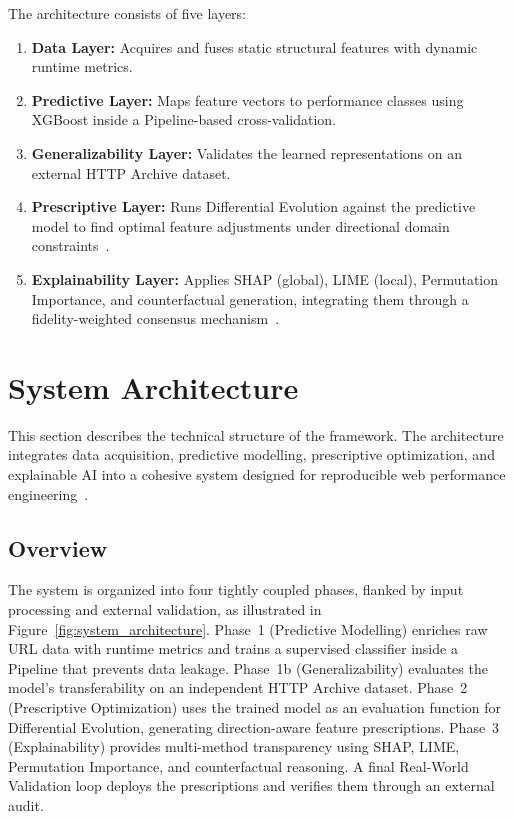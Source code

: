 \documentclass[sn-nature]{sn-jnl}
\begin{document}
The architecture consists of five layers:

\begin{enumerate}
    \item \textbf{Data Layer:} Acquires and fuses static structural features with dynamic runtime metrics.
    \item \textbf{Predictive Layer:} Maps feature vectors to performance classes using XGBoost inside a Pipeline-based cross-validation.
    \item \textbf{Generalizability Layer:} Validates the learned representations on an external HTTP Archive dataset.
    \item \textbf{Prescriptive Layer:} Runs Differential Evolution against the predictive model to find optimal feature adjustments under directional domain constraints~\cite{asha2025}.
    \item \textbf{Explainability Layer:} Applies SHAP (global), LIME (local), Permutation Importance, and counterfactual generation, integrating them through a fidelity-weighted consensus mechanism~\cite{goldwasser2024}.
\end{enumerate}


\section{System Architecture}\label{sec4}

This section describes the technical structure of the framework. The architecture integrates data acquisition, predictive modelling, prescriptive optimization, and explainable AI into a cohesive system designed for reproducible web performance engineering~\cite{ghattas2025, mathur2024, vanriet2023, notz2024}.

\subsection{Overview}

The system is organized into four tightly coupled phases, flanked by input processing and external validation, as illustrated in Figure~\ref{fig:system_architecture}. Phase~1 (Predictive Modelling) enriches raw URL data with runtime metrics and trains a supervised classifier inside a Pipeline that prevents data leakage. Phase~1b (Generalizability) evaluates the model's transferability on an independent HTTP Archive dataset. Phase~2 (Prescriptive Optimization) uses the trained model as an evaluation function for Differential Evolution, generating direction-aware feature prescriptions. Phase~3 (Explainability) provides multi-method transparency using SHAP, LIME, Permutation Importance, and counterfactual reasoning. A final Real-World Validation loop deploys the prescriptions and verifies them through an external audit.
\end{document}
